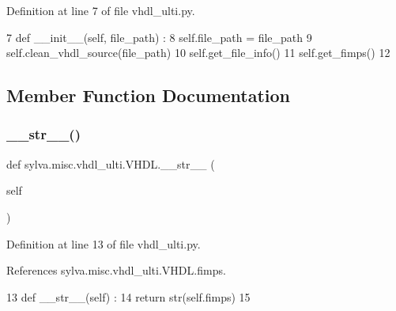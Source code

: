 Definition at line 7 of file vhdl\+\_\+ulti.\+py.


\begin{DoxyCode}
7   \textcolor{keyword}{def }\_\_init\_\_(self, file\_path) :
8     self.file\_path = file\_path
9     self.clean\_vhdl\_source(file\_path)
10     self.get\_file\_info()
11     self.get\_fimps()
12 
\end{DoxyCode}


\subsection{Member Function Documentation}
\mbox{\label{classsylva_1_1misc_1_1vhdl__ulti_1_1_v_h_d_l_a2a6786cbe721ea37e8ada800f5787ba4}} 
\subsubsection{\texorpdfstring{\+\_\+\+\_\+str\+\_\+\+\_\+()}{\_\_str\_\_()}}
{\footnotesize\ttfamily def sylva.\+misc.\+vhdl\+\_\+ulti.\+V\+H\+D\+L.\+\_\+\+\_\+str\+\_\+\+\_\+ (\begin{DoxyParamCaption}\item[{}]{self }\end{DoxyParamCaption})}



Definition at line 13 of file vhdl\+\_\+ulti.\+py.



References sylva.\+misc.\+vhdl\+\_\+ulti.\+V\+H\+D\+L.\+fimps.


\begin{DoxyCode}
13   \textcolor{keyword}{def }\_\_str\_\_(self) :
14     \textcolor{keywordflow}{return} str(self.fimps)
15 
\end{DoxyCode}
\mbox{\label{classsylva_1_1misc_1_1vhdl__ulti_1_1_v_h_d_l_ad7c048b801d2a2259246cf8d08d37fab}} 
